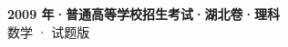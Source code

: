 \documentclass[zihao=-4, a4paper]{ctexart}
\begin{document}
\begin{center}
  {\Large\bfseries 2009 年·普通高等学校招生考试·湖北卷·理科}\\[4pt]
  {\large 数学 · 试题版}
\end{center}
\medskip
{}

\end{document}
